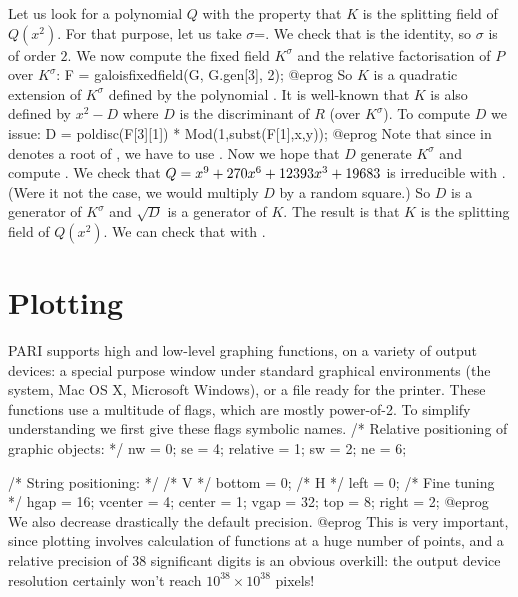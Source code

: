 Let us look for a polynomial $Q$ with the property that $K$ is the splitting
field of $Q(x^2)$. For that purpose, let us take $\sigma$=.  We
check that  is the identity, so $\sigma$ is of order $2$. We now compute the fixed field $K^\sigma$ and the relative factorisation of $P$ over
$K^\sigma$:
\bprog
F = galoisfixedfield(G, G.gen[3], 2);
@eprog\noindent
So $K$ is a quadratic extension of $K^\sigma$ defined by the polynomial
. It is well-known that $K$ is also defined by $x^2-D$
where $D$ is the discriminant of $R$ (over $K^\sigma$).
To compute $D$ we issue:
\bprog
D = poldisc(F[3][1]) * Mod(1,subst(F[1],x,y));
@eprog\noindent
Note that since  in  denotes a root of , we
have to use .  Now we hope that $D$ generate $K^\sigma$ and
compute . We check that $Q=x^9+270\*x^6+12393\*x^3+19683$ is
irreducible with . (Were it not the case, we would
multiply $D$ by a random square.) So $D$ is a generator of $K^\sigma$ and
$\sqrt{D}$ is a generator of $K$. The result is that $K$ is the splitting
field of $Q(x^2)$.  We can check that with
.

\section{Plotting}

PARI supports high and low-level graphing functions, on a variety of output
devices: a special purpose window under standard graphical environments (the
 system, Mac OS X, Microsoft Windows), or a 
file ready for the printer. These functions use a multitude of flags, which
are mostly power-of-2. To simplify understanding we first give these flags
symbolic names.
\bprog
  /* Relative positioning of graphic objects: */
  nw       = 0;  se       = 4;  relative = 1;
  sw       = 2;  ne       = 6;

  /* String positioning: */
  /* V */ bottom  =  0;   /* H */  left   = 0;   /* Fine tuning */ hgap = 16;
          vcenter =  4;            center = 1;                     vgap = 32;
          top     =  8;            right  = 2;
@eprog\noindent
We also decrease drastically the default precision.
\bprog
@eprog\noindent
This is very important, since plotting involves calculation of functions at
a huge number of points, and a relative precision of 38 significant digits
is an obvious overkill: the output device resolution certainly won't reach
$10^{38} \times 10^{38}$ pixels!

